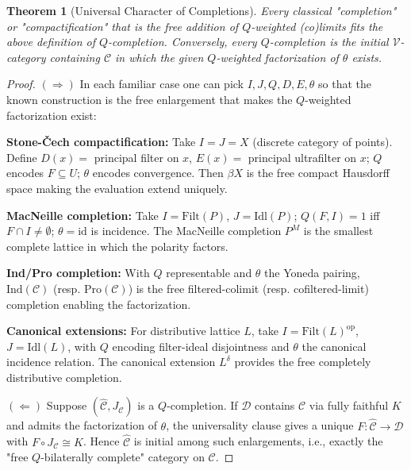 \documentclass[11pt]{article}
\theoremstyle{plain}
\newtheorem{theorem}{Theorem}[section]
\theoremstyle{definition}
\theoremstyle{remark}
\newcommand{\V}{\mathcal{V}}
\newcommand{\op}{\mathrm{op}}
\begin{document}
\begin{theorem}[Universal Character of Completions]
Every classical "completion" or "compactification" that is the free addition of $Q$-weighted (co)limits fits the above definition of $Q$-completion. Conversely, every $Q$-completion is the initial $\V$-category containing $\mathcal{C}$ in which the given $Q$-weighted factorization of $\theta$ exists.
\end{theorem}

\begin{proof}
$(\Rightarrow)$ In each familiar case one can pick $I, J, Q, D, E, \theta$ so that the known construction is the free enlargement that makes the $Q$-weighted factorization exist:

\textbf{Stone-\v{C}ech compactification:} Take $I = J = X$ (discrete category of points). Define $D(x) = $ principal filter on $x$, $E(x) = $ principal ultrafilter on $x$; $Q$ encodes $F \subseteq U$; $\theta$ encodes convergence. Then $\beta X$ is the free compact Hausdorff space making the evaluation extend uniquely.

\textbf{MacNeille completion:} Take $I = \mathrm{Filt}(P)$, $J = \mathrm{Idl}(P)$; $Q(F,I) = 1$ iff $F \cap I \neq \emptyset$; $\theta = \mathrm{id}$ is incidence. The MacNeille completion $P^M$ is the smallest complete lattice in which the polarity factors.

\textbf{Ind/Pro completion:} With $Q$ representable and $\theta$ the Yoneda pairing, $\mathrm{Ind}(\mathcal{C})$ (resp. $\mathrm{Pro}(\mathcal{C})$) is the free filtered-colimit (resp. cofiltered-limit) completion enabling the factorization.

\textbf{Canonical extensions:} For distributive lattice $L$, take $I = \mathrm{Filt}(L)^{\op}$, $J = \mathrm{Idl}(L)$, with $Q$ encoding filter-ideal disjointness and $\theta$ the canonical incidence relation. The canonical extension $L^{\delta}$ provides the free completely distributive completion.

$(\Leftarrow)$ Suppose $(\widehat{\mathcal{C}}, J_{\mathcal{C}})$ is a $Q$-completion. If $\mathcal{D}$ contains $\mathcal{C}$ via fully faithful $K$ and admits the factorization of $\theta$, the universality clause gives a unique $F : \widehat{\mathcal{C}} \to \mathcal{D}$ with $F \circ J_{\mathcal{C}} \cong K$. Hence $\widehat{\mathcal{C}}$ is initial among such enlargements, i.e., exactly the "free $Q$-bilaterally complete" category on $\mathcal{C}$.
\end{proof}
\end{document}
